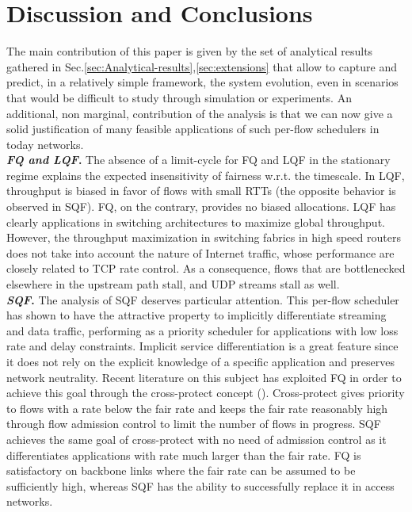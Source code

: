 \documentclass[a4paper,oneside, 11pt]{article}
\begin{document}
\section{Discussion and Conclusions}\label{sec:discussion}
The main contribution of this paper is given by the set of analytical
results gathered in Sec.\ref{sec:Analytical-results},\ref{sec:extensions}
that allow to capture and predict, in a relatively simple framework, the system evolution,
even in scenarios that would be difficult to study through simulation or experiments.
An additional, non marginal, contribution of the analysis is that we can now give a solid justification of many feasible
applications of such per-flow schedulers in today networks.\\
\textbf{\textit{FQ and LQF}.}
The absence of a limit-cycle for FQ and LQF in the stationary regime
explains the expected insensitivity of fairness w.r.t. the timescale.
In LQF, throughput is biased in favor of flows with small RTTs (the opposite
behavior is observed in SQF).
FQ, on the contrary, provides no biased allocations.
LQF has clearly applications in switching architectures to maximize global throughput. However,
the throughput maximization in switching fabrics in high speed routers
does not take into account the nature of Internet traffic, whose performance are closely related to TCP rate control.
As a consequence, flows that are bottlenecked elsewhere in the upstream path stall, and UDP streams
stall as well.\\
\textbf{\textit{SQF}.}
The analysis of SQF deserves particular attention. This per-flow scheduler has shown to have the attractive
property to implicitly differentiate streaming and data traffic, performing as a priority
scheduler for applications with low loss rate and delay constraints. Implicit service differentiation
is a great feature since it does not rely on the explicit knowledge of a specific application and preserves
network neutrality.
Recent literature on this subject has exploited FQ in order to achieve this goal
through the cross-protect concept (\hspace{-0.1mm}\cite{hpsr,ancs05}). Cross-protect gives priority to flows with
a rate below the fair rate and keeps the fair rate reasonably high through flow admission control
to limit the number of flows in progress. SQF achieves the same goal of cross-protect with no need of admission control as it differentiates
applications with rate much larger than the fair rate.
FQ is satisfactory on backbone links where the fair
rate can be assumed to be sufficiently high, whereas SQF has the ability to successfully replace it in access networks.
\end{document}
